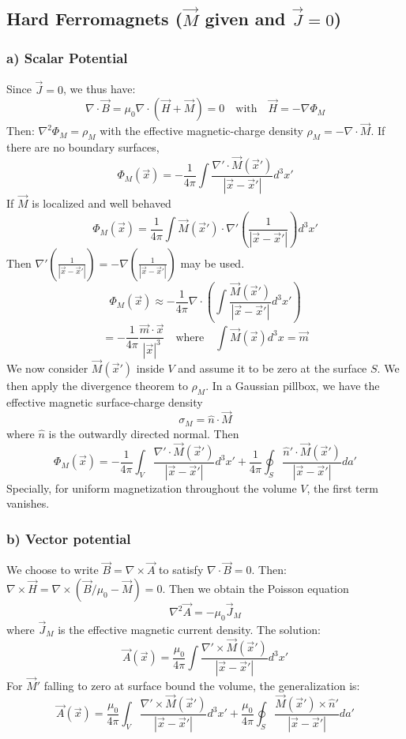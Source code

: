 \documentclass{article}
\begin{document}
	\subsection*{Hard Ferromagnets ($\vec{M}$ given and $\vec{J}=0$)}
	\subsubsection*{a) Scalar Potential}
	Since $\vec{J}=0$, we thus have:
	$$ \nabla \cdot \vec{B} = \mu_0 \nabla \cdot (\vec{H} + \vec{M}) = 0 \quad \text{with} \quad \vec{H} = -\nabla \Phi_M $$
	Then: $\nabla^2 \Phi_M = \rho_M$ with the effective magnetic-charge density $\rho_M = -\nabla \cdot \vec{M}$.
	If there are no boundary surfaces,
	$$ \Phi_M(\vec{x}) = -\frac{1}{4\pi} \int \frac{\nabla' \cdot \vec{M}(\vec{x}')}{|\vec{x}-\vec{x}'|} d^3x' $$
	If $\vec{M}$ is localized and well behaved
	$$ \Phi_M(\vec{x}) = \frac{1}{4\pi} \int \vec{M}(\vec{x}') \cdot \nabla' \left( \frac{1}{|\vec{x}-\vec{x}'|} \right) d^3x' $$
	Then $\nabla'(\frac{1}{|\vec{x}-\vec{x}'|}) = -\nabla(\frac{1}{|\vec{x}-\vec{x}'|})$ may be used.
	$$ \Phi_M(\vec{x}) \approx -\frac{1}{4\pi} \nabla \cdot \left( \int \frac{\vec{M}(\vec{x}')}{|\vec{x}-\vec{x}'|} d^3x' \right) $$
	$$ = -\frac{1}{4\pi} \frac{\vec{m} \cdot \vec{x}}{|\vec{x}|^3} \quad \text{where} \quad \int \vec{M}(\vec{x}) d^3x = \vec{m} $$
	We now consider $\vec{M}(\vec{x}')$ inside $V$ and assume it to be zero at the surface $S$.
	We then apply the divergence theorem to $\rho_M$.
	In a Gaussian pillbox, we have the effective magnetic surface-charge density
	$$ \sigma_M = \hat{n} \cdot \vec{M} $$
	where $\hat{n}$ is the outwardly directed normal.
	Then
	$$ \Phi_M(\vec{x}) = -\frac{1}{4\pi} \int_V \frac{\nabla' \cdot \vec{M}(\vec{x}')}{|\vec{x}-\vec{x}'|} d^3x' + \frac{1}{4\pi} \oint_S \frac{\hat{n}' \cdot \vec{M}(\vec{x}')}{|\vec{x}-\vec{x}'|} da' $$
	Specially, for uniform magnetization throughout the volume $V$, the first term vanishes.
	
	\subsubsection*{b) Vector potential}
	We choose to write $\vec{B} = \nabla \times \vec{A}$ to satisfy $\nabla \cdot \vec{B} = 0$.
	Then: $\nabla \times \vec{H} = \nabla \times (\vec{B}/\mu_0 - \vec{M}) = 0$.
	Then we obtain the Poisson equation
	$$ \nabla^2 \vec{A} = -\mu_0 \vec{J}_M $$
	where $\vec{J}_M$ is the effective magnetic current density.
	The solution:
	$$ \vec{A}(\vec{x}) = \frac{\mu_0}{4\pi} \int \frac{\nabla' \times \vec{M}(\vec{x}')}{|\vec{x}-\vec{x}'|} d^3x' $$
	For $\vec{M}'$ falling to zero at surface bound the volume, the generalization is:
	$$ \vec{A}(\vec{x}) = \frac{\mu_0}{4\pi} \int_V \frac{\nabla' \times \vec{M}(\vec{x}')}{|\vec{x}-\vec{x}'|} d^3x' + \frac{\mu_0}{4\pi} \oint_S \frac{\vec{M}(\vec{x}') \times \hat{n}'}{|\vec{x}-\vec{x}'|} da' $$
	
\end{document}
